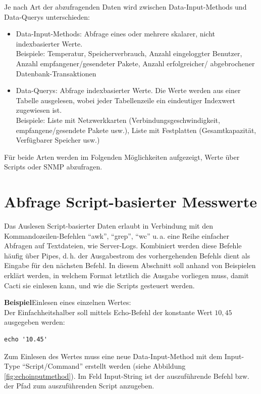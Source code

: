 \documentclass[12pt,ngerman,toc=listofnumbered,toc=bibliographynumbered,toc=index,headsepline=true]{scrbook}
\begin{document}
Je nach Art der abzufragenden Daten wird zwischen Data-Input-Methods und
Data-Querys unterschieden:
\begin{itemize}
  \item Data-Input-Methods: Abfrage eines oder mehrere skalarer, nicht
  indexbasierter Werte.\\
  Beispiele: Temperatur, Speicherverbrauch, Anzahl eingeloggter Benutzer, Anzahl
  empfangener/gesendeter Pakete, Anzahl erfolgreicher/ abgebrochener
  Datenbank-Transaktionen
  \item Data-Querys: Abfrage indexbasierter Werte. Die Werte werden aus einer
  Tabelle ausgelesen, wobei jeder Tabellenzeile ein eindeutiger Indexwert
  zugewiesen ist.\\
  Beispiele: Liste mit Netzwerkkarten (Verbindungsgeschwindigkeit,
  empfangene/gesendete Pakete usw.), Liste mit Festplatten (Gesamtkapazität,
  Verfügbarer Speicher usw.)
\end{itemize}
Für beide Arten werden im Folgenden Möglichkeiten aufgezeigt, Werte über Scripts
oder SNMP abzufragen.

\section{Abfrage Script-basierter Messwerte}
\label{subsec:AbfrageScript}
Das Auslesen Script-basierter Daten erlaubt in Verbindung mit den
Kom\-man\-dozeilen-Befehlen \enquote{awk}, \enquote{grep}, \enquote{wc} u.\,a. 
eine Reihe einfacher Abfragen auf Textdateien, wie Server-Logs. Kombiniert werden
diese Befehle häufig über Pipes, d.\,h. der Ausgabestrom des vorhergehenden
Befehls dient als Eingabe für den nächsten Befehl. In diesem Abschnitt soll
anhand von Beispielen erklärt werden, in welchem Format letztlich die Ausgabe
vorliegen muss, damit Cacti sie einlesen kann, und wie die Scripts gesteuert werden.

\textbf{Beispiel}\quad Einlesen eines einzelnen Wertes:\\[1ex]
Der Einfachheitshalber soll mittels Echo-Befehl der konstante Wert $10,45$
ausgegeben werden:
\begin{lstlisting}[xleftmargin=20pt]
echo '10.45'
\end{lstlisting}
Zum Einlesen des Wertes muss eine neue Data-Input-Method mit dem
Input-Type \enquote{Script/Command} erstellt werden (siehe Abbildung
\ref{fig:echoinputmethod}). Im Feld Input-String ist der auszuführende Befehl
bzw. der Pfad zum auszuführenden Script anzugeben.
\end{document}
